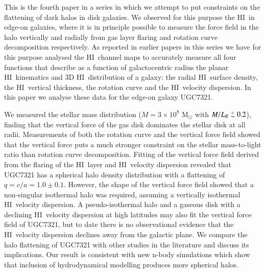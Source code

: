 \documentclass[traditabstract]{aa} %
\newcommand\lesim{\lower.5ex\hbox{$\; \buildrel < \over \sim \;$}}
\newcommand\HI{H{\small I}}
\newcommand\msun{M$_{\odot }$}
\begin{document}
  \abstract
   {This is the fourth paper in a series in which we attempt to put
constraints on the flattening of dark halos in disk galaxies. We
observed for this purpose the \HI\ in edge-on galaxies, where it is in principle
possible to measure the force field in the halo vertically and radially
from gas layer flaring and rotation curve decomposition respectively.  
As reported in earlier papers in this series we have for
this purpose analysed the \HI\ channel maps to accurately measure all four 
functions that describe as a function of galactocentric radius the planar \HI\ 
kinematics and 3D \HI\ distribution of a galaxy: the radial \HI\ surface density, 
the \HI\ vertical thickness, the rotation curve and the \HI\ velocity dispersion. 
In this paper we analyse these data for the edge-on galaxy UGC7321. 

We measured the stellar mass distribution ($M=3\times10^8$ \msun 
with $M/L_R\lesim0.2$), finding that the vertical force of 
the gas disk dominates the 
stellar disk at all radii. Measurements of both the rotation curve and the
vertical force field showed that the vertical force puts a much
stronger constraint on the stellar mass-to-light ratio than rotation 
curve decomposition. Fitting of the vertical force field derived from the 
flaring of the \HI\ layer and \HI\ velocity dispersion revealed that UGC7321 
has a spherical halo density distribution with a flattening of 
$q = c/a = 1.0 \pm 0.1$. However, 
the shape of the vertical force field showed that a non-singular isothermal 
halo was required, 
assuming a vertically isothermal \HI\ velocity dispersion. 
A pseudo-isothermal halo and a 
gaseous disk with a declining \HI\ velocity dispersion at high latitudes may 
also fit the vertical 
force field of UGC7321, but to date there is no observational evidence 
that the \HI\ velocity dispersion declines away from the galactic plane. 
We compare the halo flattening of UGC7321 with other 
studies in the literature and discuss its implications. 
Our result is consistent with new n-body simulations which show that 
inclusion of hydrodynamical modelling produces more spherical halos.
}
   {}


   \maketitle
%
\end{document}
